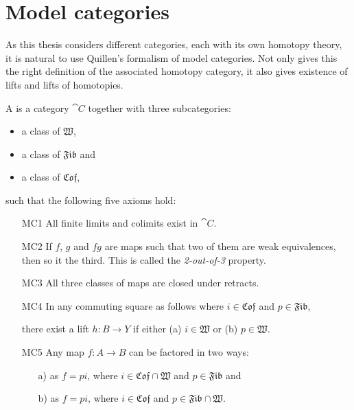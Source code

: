 
\chapter{Model categories}
\label{sec:model_categories}

As this thesis considers different categories, each with its own homotopy theory, it is natural to use Quillen's formalism of model categories. Not only gives this the right definition of the associated homotopy category, it also gives existence of lifts and lifts of homotopies.

\newcommand{\W}{\mathfrak{W}}
\newcommand{\Fib}{\mathfrak{Fib}}
\newcommand{\Cof}{\mathfrak{Cof}}

\begin{definition}
	A  is a category $\cat{C}$ together with three subcategories:
	\begin{itemize}
		\item a class of  $\W$,
		\item a class of  $\Fib$ and
		\item a class of  $\Cof$,
	\end{itemize}
	such that the following five axioms hold:
	\begin{itemize}
		\item[MC1] All finite limits and colimits exist in $\cat{C}$.
		\item[MC2] If $f$, $g$ and $fg$ are maps such that two of them are weak equivalences, then so it the third. This is called the \emph{2-out-of-3} property.
		\item[MC3] All three classes of maps are closed under retracts.
		\item[MC4] In any commuting square as follows where $i \in \Cof$ and $p \in \Fib$,

			there exist a lift $h: B \to Y$ if either (a) $i \in \W$ or (b) $p \in \W$.
		\item[MC5] Any map $f : A \to B$ can be factored in two ways:
			\begin{itemize}
				\item[a)] as $f = pi$, where $i \in \Cof \cap \W$ and $p \in \Fib$ and
				\item[b)] as $f = pi$, where $i \in \Cof$ and $p \in \Fib \cap \W$.
			\end{itemize}
	\end{itemize}
\end{definition}

